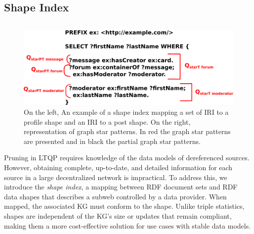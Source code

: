 \subsection{Shape Index}

\begin{figure}
   \centering
   \begin{minipage}[t]{0.50\linewidth}
      \centering
      \begin{tabular}{c}
         
      \end{tabular}
      
   \end{minipage}
   \hspace{0.05\textwidth}
   \begin{minipage}[t]{0.30\linewidth}
      \centering
      \includegraphics[width=1\textwidth]{figure/q_star.png}
   \end{minipage}

   \caption{
      On the left, An example of a shape index mapping a set of IRI to a profile shape and an IRI to a post shape.
       On the right, representation of graph star patterns.
       In red the graph star patterns are presented and in black the partial graph star patterns.
       }
   \label{fig:shapeIndex}
\end{figure}

Pruning in LTQP requires knowledge of the data models of dereferenced sources.  
However, obtaining complete, up-to-date, and detailed information for each source in a large decentralized network is impractical.  
To address this, we introduce the \emph{shape index}, a mapping between RDF document sets and RDF data shapes that describes a subweb controlled by a data provider.  
When mapped, the associated KG must conform to the shape.  
Unlike triple statistics, shapes are independent of the KG's size or updates that remain compliant, making them a more cost-effective solution for use cases with stable data models. 

